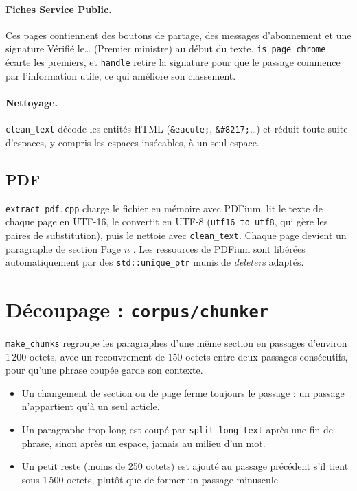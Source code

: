 \documentclass[11pt,a4paper]{article}
\newcommand{\fichier}[1]{\texttt{#1}}
\begin{document}

\paragraph{Fiches Service Public.} Ces pages contiennent des boutons de partage, des messages d'abonnement et une signature \og Vérifié le\dots{} (Premier ministre) \fg{} au début du texte. \texttt{is\_page\_chrome} écarte les premiers, et \texttt{handle} retire la signature pour que le passage commence par l'information utile, ce qui améliore son classement.

\paragraph{Nettoyage.} \texttt{clean\_text} décode les entités HTML (\texttt{\&eacute;}, \texttt{\&\#8217;}\dots) et réduit toute suite d'espaces, y compris les espaces insécables, à un seul espace.

\subsection{PDF}

\fichier{extract\_pdf.cpp} charge le fichier en mémoire avec PDFium, lit le texte de chaque page en UTF-16, le convertit en UTF-8 (\texttt{utf16\_to\_utf8}, qui gère les paires de substitution), puis le nettoie avec \texttt{clean\_text}. Chaque page devient un paragraphe de section \og Page $n$ \fg. Les ressources de PDFium sont libérées automatiquement par des \texttt{std::unique\_ptr} munis de \emph{deleters} adaptés.

\section{Découpage : \texttt{corpus/chunker}}

\texttt{make\_chunks} regroupe les paragraphes d'une même section en passages d'environ 1\,200 octets, avec un recouvrement de 150 octets entre deux passages consécutifs, pour qu'une phrase coupée garde son contexte.


\begin{itemize}
  \item Un changement de section ou de page ferme toujours le passage : un passage n'appartient qu'à un seul article.
  \item Un paragraphe trop long est coupé par \texttt{split\_long\_text} après une fin de phrase, sinon après un espace, jamais au milieu d'un mot.
  \item Un petit reste (moins de 250 octets) est ajouté au passage précédent s'il tient sous 1\,500 octets, plutôt que de former un passage minuscule.
\end{itemize}
\end{document}
